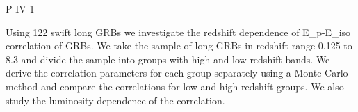 P-IV-1


\bigskip



\bigskip

\noindent Using 122 swift long GRBs we investigate the redshift dependence of E_p-E_{iso} correlation of GRBs. 
We take the sample of long GRBs in redshift range 0.125 to 8.3 and 
divide the sample into groups with high and low redshift bands. We derive the correlation parameters for each group separately using a Monte Carlo method and compare the correlations for low and high redshift groups.
We also study the luminosity dependence of the correlation.
